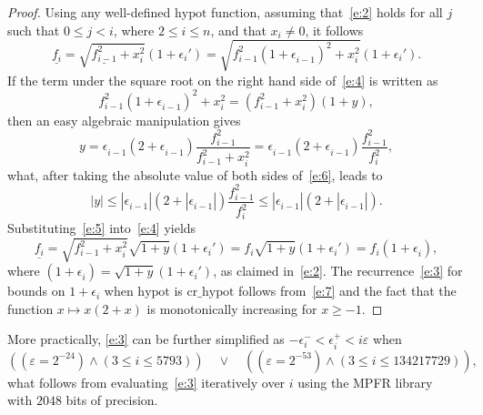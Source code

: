 \documentclass[a4paper,12pt,twoside]{article}
\begin{document}
\begin{proof}
  Using any well-defined $\mathrm{hypot}$ function, assuming
  that~\eqref{e:2} holds for all $j$ such that $0\le j<i$, where
  $2\le i\le n$, and that $x_i\ne 0$, it follows
  \begin{equation}
    \underline{f_i^{}}=\sqrt{\underline{f_{i-1}^2}+x_i^2}(1+\epsilon_i')=\sqrt{f_{i-1}^2(1+\epsilon_{i-1}^{})^2+x_i^2}(1+\epsilon_i').
    \label{e:4}
  \end{equation}
  If the term under the square root on the right hand side
  of~\eqref{e:4} is written as
  \begin{equation}
    f_{i-1}^2(1+\epsilon_{i-1}^{})^2+x_i^2=(f_{i-1}^2+x_i^2)(1+y),
    \label{e:5}
  \end{equation}
  then an easy algebraic manipulation gives
  \begin{equation}
    y=\epsilon_{i-1}^{}(2+\epsilon_{i-1}^{})\frac{f_{i-1}^2}{f_{i-1}^2+x_i^2}=\epsilon_{i-1}^{}(2+\epsilon_{i-1}^{})\frac{f_{i-1}^2}{f_i^2},
    \label{e:6}
  \end{equation}
  what, after taking the absolute value of both sides of~\eqref{e:6},
  leads to
  \begin{equation}
    |y|\le|\epsilon_{i-1}^{}|(2+|\epsilon_{i-1}^{}|)\frac{f_{i-1}^2}{f_i^2}\le|\epsilon_{i-1}^{}|(2+|\epsilon_{i-1}^{}|).
    \label{e:7}
  \end{equation}
  Substituting~\eqref{e:5} into~\eqref{e:4} yields
  \begin{displaymath}
    \underline{f_i^{}}=\sqrt{f_{i-1}^2+x_i^2}\sqrt{1+y}(1+\epsilon_i')=f_i^{}\sqrt{1+y}(1+\epsilon_i')=f_i^{}(1+\epsilon_i^{}),
  \end{displaymath}
  where $(1+\epsilon_i^{})=\sqrt{1+y}(1+\epsilon_i')$, as claimed
  in~\eqref{e:2}.  The recurrence~\eqref{e:3} for bounds on
  $1+\epsilon_i$ when $\mathrm{hypot}$ is $\mathrm{cr\_hypot}$ follows
  from~\eqref{e:7} and the fact that the function $x\mapsto x(2+x)$ is
  monotonically increasing for $x\ge-1$.
\end{proof}

More practically, \eqref{e:3} can be further simplified as
$-\epsilon_i^-<\epsilon_i^+<i\varepsilon$ when
\begin{displaymath}
  ((\varepsilon=2^{-24})\wedge(3\le i\le 5793))\quad\vee\quad((\varepsilon=2^{-53})\wedge(3\le i\le 134217729)),
\end{displaymath}
what follows from evaluating~\eqref{e:3} iteratively over $i$ using
the MPFR library~\cite{Fousse-et-al-07} with $2048$ bits of precision.
\end{document}
